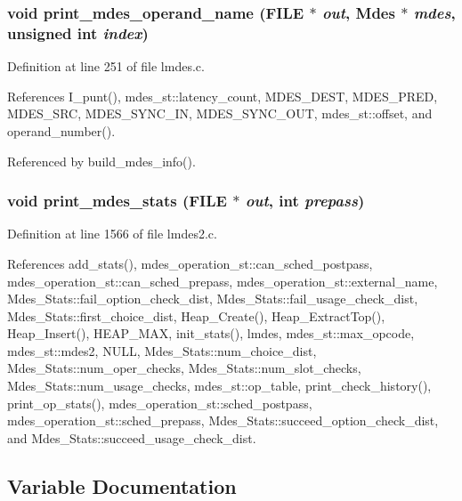 \subsubsection{\setlength{\rightskip}{0pt plus 5cm}void print\_\-mdes\_\-operand\_\-name (FILE $\ast$ {\em out}, \bf{Mdes} $\ast$ {\em mdes}, unsigned int {\em index})}\label{lmdes_8h_9f72ff9b38d5ff16f0f12fc4a82d7cac}




Definition at line 251 of file lmdes.c.

References I\_\-punt(), mdes\_\-st::latency\_\-count, MDES\_\-DEST, MDES\_\-PRED, MDES\_\-SRC, MDES\_\-SYNC\_\-IN, MDES\_\-SYNC\_\-OUT, mdes\_\-st::offset, and operand\_\-number().

Referenced by build\_\-mdes\_\-info().
\subsubsection{\setlength{\rightskip}{0pt plus 5cm}void print\_\-mdes\_\-stats (FILE $\ast$ {\em out}, int {\em prepass})}\label{lmdes_8h_8df6c58c53e5c8878fdacd3b6bd89819}




Definition at line 1566 of file lmdes2.c.

References add\_\-stats(), mdes\_\-operation\_\-st::can\_\-sched\_\-postpass, mdes\_\-operation\_\-st::can\_\-sched\_\-prepass, mdes\_\-operation\_\-st::external\_\-name, Mdes\_\-Stats::fail\_\-option\_\-check\_\-dist, Mdes\_\-Stats::fail\_\-usage\_\-check\_\-dist, Mdes\_\-Stats::first\_\-choice\_\-dist, Heap\_\-Create(), Heap\_\-Extract\-Top(), Heap\_\-Insert(), HEAP\_\-MAX, init\_\-stats(), lmdes, mdes\_\-st::max\_\-opcode, mdes\_\-st::mdes2, NULL, Mdes\_\-Stats::num\_\-choice\_\-dist, Mdes\_\-Stats::num\_\-oper\_\-checks, Mdes\_\-Stats::num\_\-slot\_\-checks, Mdes\_\-Stats::num\_\-usage\_\-checks, mdes\_\-st::op\_\-table, print\_\-check\_\-history(), print\_\-op\_\-stats(), mdes\_\-operation\_\-st::sched\_\-postpass, mdes\_\-operation\_\-st::sched\_\-prepass, Mdes\_\-Stats::succeed\_\-option\_\-check\_\-dist, and Mdes\_\-Stats::succeed\_\-usage\_\-check\_\-dist.

\subsection{Variable Documentation}
